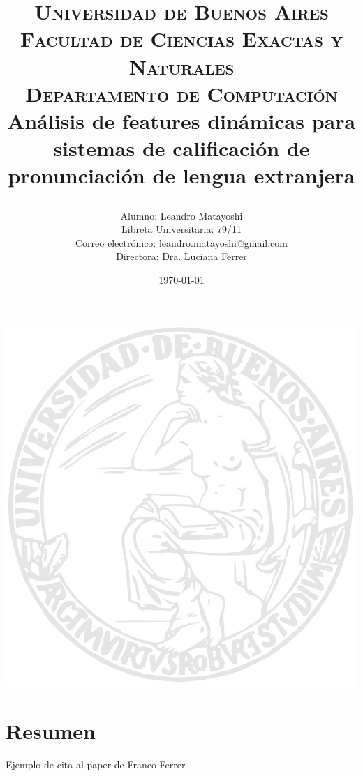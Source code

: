 \documentclass[a4paper,12pt]{article} %
\title{	
\normalfont \normalsize 
\textsc{Universidad de Buenos Aires \\ Facultad de Ciencias Exactas y Naturales \\ Departamento de Computaci\'on} \\ [25pt] %
\huge Análisis de features dinámicas para sistemas de calificación de pronunciación
de lengua extranjera\\ %
\date{\today}
\vspace{20px}
}
\author{
	Alumno: Leandro Matayoshi \\ 
	Libreta Universitaria: 79/11 \\ 
	Correo electr\'onico: leandro.matayoshi@gmail.com \\ 
	Directora: Dra. Luciana Ferrer
	\vspace{10px}
}
\begin{document}

\begin{titlepage}
\maketitle
\begin{minipage}[t]{\textwidth}
    \begin{minipage}[t]{.55 \textwidth}
        \includegraphics{logo_uba.jpg}
    \end{minipage}%
\end{minipage}%
\end{titlepage}


\section{Resumen}

Ejemplo de cita al paper de Franco Ferrer \cite{franco_ferrer_main_paper} 
\end{document}
